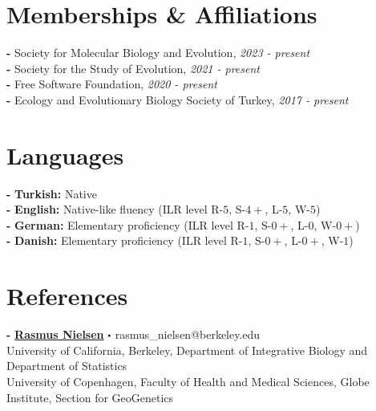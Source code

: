 \documentclass[letterpaper,10.5pt]{article}
\newcommand\sbullet[1][.5]{\mathbin{\vcenter{\hbox{\scalebox{#1}{$\bullet$}}}}}
\begin{document}
\section{Memberships \& Affiliations}
\textbf{-} Society for Molecular Biology and Evolution, \textit{2023 - present} \\
\textbf{-} Society for the Study of Evolution, \textit{2021 - present} \\
\textbf{-} Free Software Foundation, \textit{2020 - present} \\
\textbf{-} Ecology and Evolutionary Biology Society of Turkey, \textit{2017 - present} \\

 

\section{Languages}
    \textbf{-}  \textbf{Turkish:} Native \\
    \textbf{-}  \textbf{English:} Native-like fluency (ILR level R-$5$, S-$4+$, L-$5$, W-$5$) \\
    \textbf{-}  \textbf{German:} Elementary proficiency (ILR level R-$1$, S-$0+$, L-$0$, W-$0+$) \\
    \textbf{-}  \textbf{Danish:} Elementary proficiency (ILR level R-$1$, S-$0+$, L-$0+$, W-$1$) \\

\section{References}

\textbf{-} \textbf{\href{https://scholar.google.com/citations?user=PySbfcEAAAAJ&hl=en&oi=ao}{Rasmus Nielsen}}  $\sbullet[.5]$ rasmus\_nielsen@berkeley.edu \\
University of California, Berkeley, Department of Integrative Biology and Department of Statistics \\
University of Copenhagen, Faculty of Health and Medical Sciences, Globe Institute, Section for GeoGenetics \\
\end{document}
